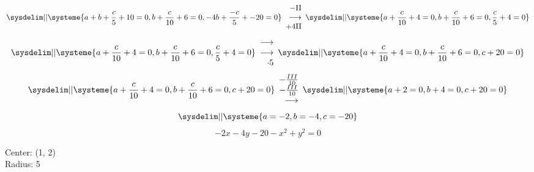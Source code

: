 \documentclass{article}
\begin{document}
\begin{equation*}
    \sysdelim||\systeme{
        a +  b + \frac{c}{5} + 10 = 0,
        b + \frac{c}{10} + 6 = 0,
        -4 b + \frac{-c}{5} + -20  = 0
    }
    \begin{array}{rr}
        -$II$\\
        \longrightarrow\\
        +4$II$\\
    \end{array}
    \sysdelim||\systeme{
        a +  \frac{c}{10} + 4 = 0,
        b + \frac{c}{10} + 6 = 0,
        \frac{c}{5} + 4  = 0
    }
\end{equation*}
\begin{equation*}
    \sysdelim||\systeme{
        a +  \frac{c}{10} + 4 = 0,
        b + \frac{c}{10} + 6 = 0,
        \frac{c}{5} + 4  = 0
    }
    \begin{array}{rr}
        \longrightarrow\\
        \longrightarrow\\
        \cdot 5\\
    \end{array}
    \sysdelim||\systeme{
        a +  \frac{c}{10} + 4 = 0,
        b + \frac{c}{10} + 6 = 0,
        c + 20 = 0
    }
\end{equation*}
\begin{equation*}
    \sysdelim||\systeme{
        a +  \frac{c}{10} + 4 = 0,
        b + \frac{c}{10} + 6 = 0,
        c + 20 = 0
    }
    \begin{array}{rr}
        -\frac{III}{10}\\
        -\frac{III}{10}\\
        \longrightarrow\\
    \end{array}
    \sysdelim||\systeme{
        a + 2 = 0,
        b + 4 = 0,
        c + 20 = 0
    }
\end{equation*}
\begin{equation*}
    \sysdelim||\systeme{
        a = -2,
        b = -4,
        c = -20
    }
\end{equation*}
$$- 2x - 4y -20 -x^2 + y^2  = 0$$
\begin{center} 
    Center: (1, 2)\\Radius: 5
\end{center}
\end{document}
